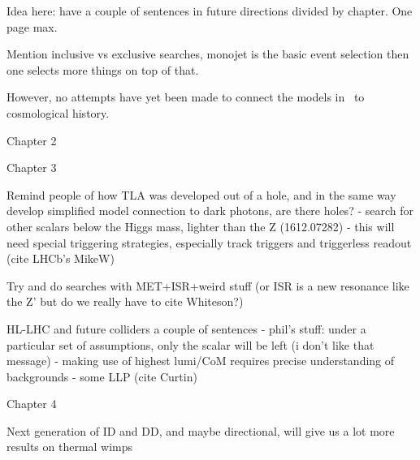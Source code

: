 Idea here: have a couple of sentences in future directions divided by chapter. One page max. 

Mention inclusive vs exclusive searches, monojet is the basic event selection then one selects more things on top of that. 


However, no attempts have yet been made to connect the models in~\cite{Buchmueller:2017uqu} to cosmological history. 

Chapter 2




Chapter 3

Remind people of how TLA was developed out of a hole, and in the same way develop simplified model connection to dark photons, are there holes?
- search for other scalars below the Higgs mass, lighter than the Z (1612.07282)
- this will need special triggering strategies, especially track triggers and triggerless readout (cite LHCb's MikeW)

Try and do searches with MET+ISR+weird stuff (or ISR is a new resonance like the Z' but do we really have to cite Whiteson?)

HL-LHC and future colliders a couple of sentences
- phil's stuff: under a particular set of assumptions, only the scalar will be left (i don't like that message)
- making use of highest lumi/CoM requires precise understanding of backgrounds
- some LLP (cite Curtin)

Chapter 4

Next generation of ID and DD, and maybe directional, will give us a lot more results on thermal wimps

